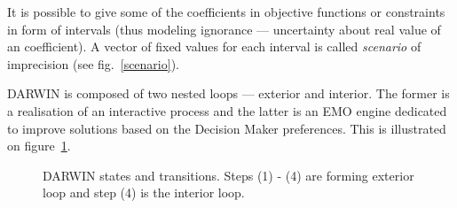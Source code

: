 It is possible to give some of the coefficients in objective functions or
constraints in form of intervals (thus modeling ignorance --- uncertainty
about real value of an coefficient). A vector of fixed values for each
interval is called \textit{scenario} of imprecision (see fig.~\ref{scenario}).

DARWIN is composed of two nested loops --- exterior and interior. The former
is a realisation of an interactive process and the latter is an EMO engine
dedicated to improve solutions based on the Decision Maker preferences. This
is illustrated on figure~\ref{fig:darwin-ext}.

\begin{figure} 
  \begin{center}
    \caption{DARWIN states and transitions. Steps (1) - (4) are forming
      exterior loop and step (4) is the interior loop.\label{fig:darwin-ext}}
  \end{center} 
\end{figure}
